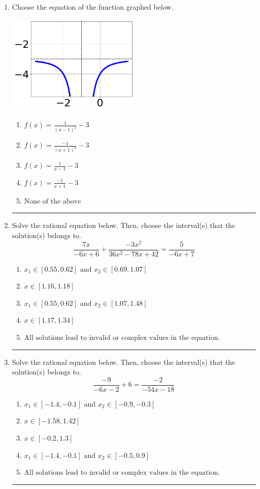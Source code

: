\documentclass[14pt]{extbook}
\newcommand{\litem}[1]{\item#1\hspace*{-1cm}\rule{\textwidth}{0.4pt}}
\begin{document}
\begin{enumerate}
{\begin{enumerate}[label=\Alph*.]
\end{enumerate} }
\litem{
Choose the equation of the function graphed below.
\begin{center}
    \includegraphics[width=0.5\textwidth]{../Figures/rationalGraphToEquationA.png}
\end{center}
\begin{enumerate}[label=\Alph*.]
\item \( f(x) = \frac{1}{(x - 1)^2} - 3 \)
\item \( f(x) = \frac{-1}{(x + 1)^2} - 3 \)
\item \( f(x) = \frac{1}{x - 1} - 3 \)
\item \( f(x) = \frac{-1}{x + 1} - 3 \)
\item \( \text{None of the above} \)

\end{enumerate} }
\litem{
Solve the rational equation below. Then, choose the interval(s) that the solution(s) belongs to.\[ \frac{7x}{-6x + 6} + \frac{-3x^{2}}{36x^{2} -78 x + 42} = \frac{5}{-6x + 7} \]\begin{enumerate}[label=\Alph*.]
\item \( x_1 \in [0.55, 0.62] \text{ and } x_2 \in [0.69,1.07] \)
\item \( x \in [1.16,1.18] \)
\item \( x_1 \in [0.55, 0.62] \text{ and } x_2 \in [1.07,1.48] \)
\item \( x \in [1.17,1.34] \)
\item \( \text{All solutions lead to invalid or complex values in the equation.} \)

\end{enumerate} }
\litem{
Solve the rational equation below. Then, choose the interval(s) that the solution(s) belongs to.\[ \frac{-9}{-6x -2} + 6 = \frac{-2}{-54x -18} \]\begin{enumerate}[label=\Alph*.]
\item \( x_1 \in [-1.4, -0.1] \text{ and } x_2 \in [-0.9,-0.3] \)
\item \( x \in [-1.58,1.42] \)
\item \( x \in [-0.2,1.3] \)
\item \( x_1 \in [-1.4, -0.1] \text{ and } x_2 \in [-0.5,0.9] \)
\item \( \text{All solutions lead to invalid or complex values in the equation.} \)


\end{enumerate}}
\end{enumerate}
\end{document}
